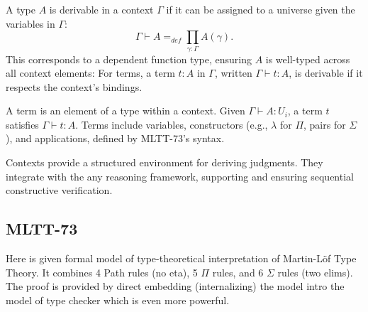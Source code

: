 \documentclass{article}
\begin{document}
\begin{definition}
A type \( A \) is derivable in a context \( \Gamma \) if it can be
assigned to a universe given the variables in \( \Gamma \):
\[
\Gamma \vdash A =_{def} \prod_{\gamma:\Gamma}A(\gamma).
\]
This corresponds to a dependent function type,
ensuring \( A \) is well-typed across all context elements:
For terms, a term \( t : A \) in \( \Gamma \), written \( \Gamma \vdash t : A \),
is derivable if it respects the context’s bindings.
\end{definition}

\begin{definition}[Terms]
A term is an element of a type within a context.
Given \( \Gamma \vdash A : U_i \), a term \( t \)
satisfies \( \Gamma \vdash t : A \). Terms include
variables, constructors (e.g., \( \lambda \) for \( \Pi \),
pairs for \( \Sigma \)), and applications, defined by MLTT-73’s
syntax.
\end{definition}

Contexts provide a structured environment for deriving judgments.
They integrate with the any reasoning framework, supporting and ensuring
sequential constructive verification.

\subsection*{MLTT-73}
Here is given formal model of type-theoretical interpretation of Martin-Löf Type Theory.
It combines 4 Path rules (no eta), 5 $\Pi$ rules, and 6 $\Sigma$ rules (two elims).
The proof is provided by direct embedding (internalizing) the model intro the model
of type checker which is even more powerful.
\end{document}
